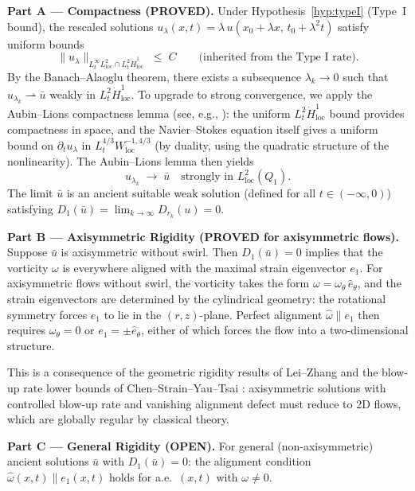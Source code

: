 \documentclass[11pt]{article}
\theoremstyle{definition}
\begin{document}
\medskip
\noindent\textbf{Part A --- Compactness (PROVED).}\;
Under Hypothesis~\ref{hyp:typeI} (Type~I bound), the rescaled solutions
$u_\lambda(x,t) = \lambda\, u(x_0 + \lambda x,\, t_0 + \lambda^2 t)$ satisfy uniform bounds
\[
  \|u_\lambda\|_{L^\infty_t L^2_{\mathrm{loc}} \cap L^2_t \dot{H}^1_{\mathrm{loc}}}
  \;\leq\; C
  \qquad \text{(inherited from the Type~I rate)}.
\]
By the Banach--Alaoglu theorem, there exists a subsequence $\lambda_k \to 0$ such that
$u_{\lambda_k} \rightharpoonup \bar{u}$ weakly in $L^2_t \dot{H}^1_{\mathrm{loc}}$.
To upgrade to strong convergence, we apply the Aubin--Lions compactness lemma
(see, e.g., \cite{JS2}):
the uniform $L^2_t \dot{H}^1_{\mathrm{loc}}$ bound provides compactness in space,
and the Navier--Stokes equation itself gives a uniform bound on $\partial_t u_\lambda$
in $L^{4/3}_t W^{-1,4/3}_{\mathrm{loc}}$ (by duality, using the quadratic structure of the nonlinearity).
The Aubin--Lions lemma then yields
\[
  u_{\lambda_k} \;\to\; \bar{u} \quad \text{strongly in } L^2_{\mathrm{loc}}(Q_1).
\]
The limit $\bar{u}$ is an ancient suitable weak solution (defined for all $t \in (-\infty, 0)$)
satisfying $D_1(\bar{u}) = \lim_{k\to\infty} D_{r_k}(u) = 0$.

\medskip
\noindent\textbf{Part B --- Axisymmetric Rigidity (PROVED for axisymmetric flows).}\;
Suppose $\bar{u}$ is axisymmetric without swirl.  Then $D_1(\bar{u}) = 0$ implies that the
vorticity $\omega$ is everywhere aligned with the maximal strain eigenvector $e_1$.
For axisymmetric flows without swirl, the vorticity takes the form $\omega = \omega_\theta\, \hat{e}_\theta$,
and the strain eigenvectors are determined by the cylindrical geometry:
the rotational symmetry forces $e_1$ to lie in the $(r, z)$-plane.
Perfect alignment $\hat{\omega} \| e_1$ then requires $\omega_\theta = 0$ or
$e_1 = \pm \hat{e}_\theta$, either of which forces the flow into a two-dimensional structure.

This is a consequence of the geometric rigidity results of Lei--Zhang \cite{LZ}
and the blow-up rate lower bounds of Chen--Strain--Yau--Tsai \cite{CSYT}:
axisymmetric solutions with controlled blow-up rate and vanishing alignment defect
must reduce to 2D flows, which are globally regular by classical theory.

\medskip
\noindent\textbf{Part C --- General Rigidity (OPEN).}\;
For general (non-axisymmetric) ancient solutions $\bar{u}$ with $D_1(\bar{u}) = 0$:
the alignment condition $\hat{\omega}(x,t) \| e_1(x,t)$ holds for a.e.\ $(x,t)$ with $\omega \neq 0$.
\end{document}
